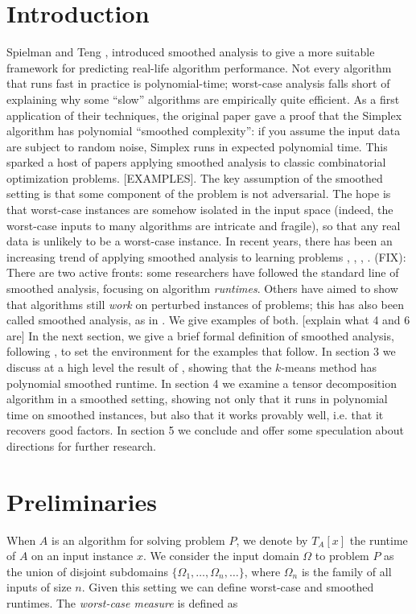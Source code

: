 \documentclass[11pt]{article}
\theoremstyle{definition}
\begin{document}
\begin{multicols}{2}

\section{Introduction}
Spielman and Teng \cite{SA}, \cite{SAtwo} introduced smoothed analysis
to give a more suitable framework for predicting real-life algorithm
performance. Not every algorithm that runs fast in practice is
polynomial-time; worst-case analysis falls short of explaining why
some ``slow'' algorithms are empirically quite efficient. As a first
application of their techniques, the original paper \cite{SA} gave a
proof that the Simplex algorithm has polynomial ``smoothed
complexity'': if you assume the input data are subject to random
noise, Simplex runs in expected polynomial time. This sparked a host
of papers applying smoothed analysis to classic combinatorial
optimization problems. [EXAMPLES]. The key assumption of the smoothed
setting is that some component of the problem is not adversarial. The
hope is that worst-case instances are somehow isolated in the input
space (indeed, the worst-case inputs to many algorithms are intricate
and fragile), so that any real data is unlikely to be a worst-case
instance. In recent years, there has been an increasing trend of
applying smoothed analysis to learning problems \cite{SAtwo},
\cite{SAkmeans}, \cite{PAC}, \cite{TD}. (FIX): There are two active fronts:
some researchers have followed the standard line of smoothed analysis,
focusing on algorithm \emph{runtimes}. Others have aimed to show that
algorithms still \emph{work} on perturbed instances of problems; this
has also been called smoothed analysis, as in \cite{TD}. We give
examples of both. [explain what 4 and 6 are] In the next section, we
give a brief formal definition of smoothed analysis, following
\cite{SAtwo}, to set the environment for the examples that follow. In
section 3 we discuss at a high level the result of \cite{SAkmeans},
showing that the $k$-means method has polynomial smoothed runtime. In
section 4 we examine a tensor decomposition algorithm in a smoothed
setting, showing not only that it runs in polynomial time on
smoothed instances, but also that it works provably well, i.e. that it
recovers good factors. In section 5 we conclude and offer some
speculation about directions for further research.

\section{Preliminaries}
When $A$ is an algorithm for solving problem $P$, we denote by
$T_A[x]$ the runtime of $A$ on an input instance $x$. We consider the
input domain $\Omega$ to problem $P$ as the union of disjoint
subdomains $\{\Omega_1,\ldots, \Omega_n,\ldots\}$, where $\Omega_n$ is
the family of all inputs of size $n$. Given this setting we can define
worst-case and smoothed runtimes. The \emph{worst-case measure} is defined as


\end{multicols}
\end{document}
